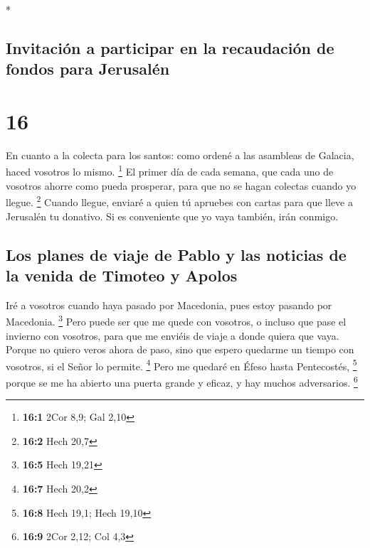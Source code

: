 \begin{paracol}{2}
\begin{otherlanguage}{english}
\end{otherlanguage}

\switchcolumn[0]*

\hypertarget{invitaciuxf3n-a-participar-en-la-recaudaciuxf3n-de-fondos-para-jerusaluxe9n}{%
\subsection{Invitación a participar en la recaudación de fondos para
Jerusalén}\label{invitaciuxf3n-a-participar-en-la-recaudaciuxf3n-de-fondos-para-jerusaluxe9n}}

\hypertarget{section-30}{%
\section{16}\label{section-30}}

 En cuanto a la colecta para los santos: como ordené a las
asambleas de Galacia, haced vosotros lo mismo. \footnote{\textbf{16:1}
  2Cor 8,9; Gal 2,10}  El primer día de cada semana, que
cada uno de vosotros ahorre como pueda prosperar, para que no se hagan
colectas cuando yo llegue. \footnote{\textbf{16:2} Hech 20,7}
 Cuando llegue, enviaré a quien tú apruebes con cartas
para que lleve a Jerusalén tu donativo.  Si es conveniente
que yo vaya también, irán conmigo.

\hypertarget{los-planes-de-viaje-de-pablo-y-las-noticias-de-la-venida-de-timoteo-y-apolos}{%
\subsection{Los planes de viaje de Pablo y las noticias de la venida de
Timoteo y
Apolos}\label{los-planes-de-viaje-de-pablo-y-las-noticias-de-la-venida-de-timoteo-y-apolos}}

 Iré a vosotros cuando haya pasado por Macedonia, pues
estoy pasando por Macedonia. \footnote{\textbf{16:5} Hech 19,21}
 Pero puede ser que me quede con vosotros, o incluso que
pase el invierno con vosotros, para que me enviéis de viaje a donde
quiera que vaya.  Porque no quiero veros ahora de paso,
sino que espero quedarme un tiempo con vosotros, si el Señor lo permite.
\footnote{\textbf{16:7} Hech 20,2}  Pero me quedaré en
Éfeso hasta Pentecostés, \footnote{\textbf{16:8} Hech 19,1; Hech 19,10}
 porque se me ha abierto una puerta grande y eficaz, y hay
muchos adversarios. \footnote{\textbf{16:9} 2Cor 2,12; Col 4,3}


\end{paracol}
